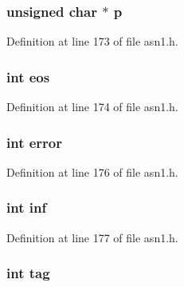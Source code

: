 \subsubsection[{\texorpdfstring{p}{p}}]{\setlength{\rightskip}{0pt plus 5cm}unsigned char $\ast$ p}\hypertarget{structasn1__ctx__st_af18a92ce774f4c499544fbcc894db7e8}{}\label{structasn1__ctx__st_af18a92ce774f4c499544fbcc894db7e8}


Definition at line 173 of file asn1.\+h.

\subsubsection[{\texorpdfstring{eos}{eos}}]{\setlength{\rightskip}{0pt plus 5cm}int eos}\hypertarget{structasn1__ctx__st_a361b5c8443971a7dbab5f334babedaed}{}\label{structasn1__ctx__st_a361b5c8443971a7dbab5f334babedaed}


Definition at line 174 of file asn1.\+h.

\subsubsection[{\texorpdfstring{error}{error}}]{\setlength{\rightskip}{0pt plus 5cm}int error}\hypertarget{structasn1__ctx__st_a11614f44ef4d939bdd984953346a7572}{}\label{structasn1__ctx__st_a11614f44ef4d939bdd984953346a7572}


Definition at line 176 of file asn1.\+h.

\subsubsection[{\texorpdfstring{inf}{inf}}]{\setlength{\rightskip}{0pt plus 5cm}int inf}\hypertarget{structasn1__ctx__st_a0726229cd75e3b3be1d6e3c8fccacb87}{}\label{structasn1__ctx__st_a0726229cd75e3b3be1d6e3c8fccacb87}


Definition at line 177 of file asn1.\+h.

\subsubsection[{\texorpdfstring{tag}{tag}}]{\setlength{\rightskip}{0pt plus 5cm}int tag}\hypertarget{structasn1__ctx__st_aab34f2fc02b4a86bea93c68e1ec09d75}{}\label{structasn1__ctx__st_aab34f2fc02b4a86bea93c68e1ec09d75}


